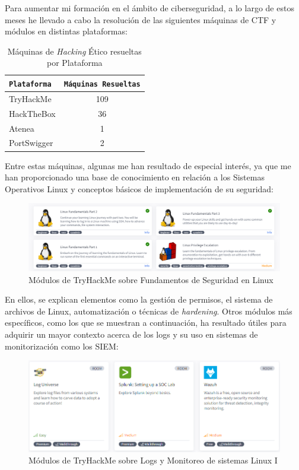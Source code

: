 Para aumentar mi formación en el ámbito de ciberseguridad, a lo largo de estos meses he llevado a cabo la resolución de las siguientes máquinas de \gls{CTF} y módulos en distintas plataformas:

\begin{table}[H]
\centering
\footnotesize
\label{tab:platform_solved_machines}
\begin{tabularx}{\textwidth}{|X|c|}
\hline
\rowcolor{graylight}\texttt{Plataforma} & \texttt{Máquinas Resueltas} \\
\hline
TryHackMe & 109 \\
\hline
HackTheBox & 36 \\
\hline
Atenea & 1 \\
\hline
PortSwigger & 2 \\
\hline
\end{tabularx}
\caption{Máquinas de \textit{Hacking} Ético resueltas por Plataforma}
\end{table}

Entre estas máquinas, algunas me han resultado de especial interés, ya que me han proporcionado una base de conocimiento en relación a los Sistemas Operativos Linux y conceptos básicos de implementación de su seguridad:

\begin{figure}[H]
    \centering
    \includegraphics[width=1\linewidth]{imagenes/linux-thm.png}
    \caption{Módulos de TryHackMe sobre Fundamentos de Seguridad en Linux \cite{tryhackmelinux}}
    \label{fig:linux-thm}
\end{figure}

En ellos, se explican elementos como la gestión de permisos, el sistema de archivos de Linux, automatización o técnicas de \textit{hardening}. Otros módulos más específicos, como los que se muestran a continuación, ha resultado útiles para adquirir un mayor contexto acerca de los logs y su uso en sistemas de monitorización como los \gls{SIEM}:

\begin{figure}[H]
    \centering
    \includegraphics[width=1\linewidth]{imagenes/logs-thm1.png}
    \caption{Módulos de TryHackMe sobre Logs y Monitoreo de sistemas Linux I}
    \label{fig:logs-thm}
\end{figure}

